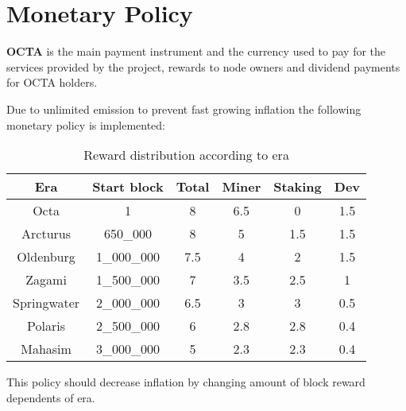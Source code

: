 \section{Monetary Policy}
\label{sec:mp}

\textbf{OCTA} is the main payment instrument and the currency used to pay for the services provided by the project,
rewards to node owners and dividend payments for OCTA holders.

Due to unlimited emission to prevent fast growing inflation the following monetary policy is implemented:

\begin{table}[h!]
\centering
\begin{tabular}{||c c c c c c||}
    \hline
        Era & Start block & Total & Miner & Staking & Dev \\ [0.5ex]

        \hline\hline
        Octa & 1 & 8 & 6.5 & 0 & 1.5 \\
        Arcturus & 650\_000 & 8 & 5 & 1.5 & 1.5 \\
        Oldenburg & 1\_000\_000 & 7.5 & 4 & 2 & 1.5 \\
        Zagami & 1\_500\_000 & 7 & 3.5 & 2.5 & 1 \\
        Springwater & 2\_000\_000 & 6.5 & 3 & 3 & 0.5 \\
        Polaris & 2\_500\_000 & 6 & 2.8 & 2.8 & 0.4 \\
        Mahasim & 3\_000\_000 & 5 & 2.3 & 2.3 & 0.4 \\ [1ex]
    \hline

\end{tabular}
\caption{Reward distribution according to era}
\label{table:1}
\end{table}

This policy should decrease inflation by changing amount of block reward dependents of era.

